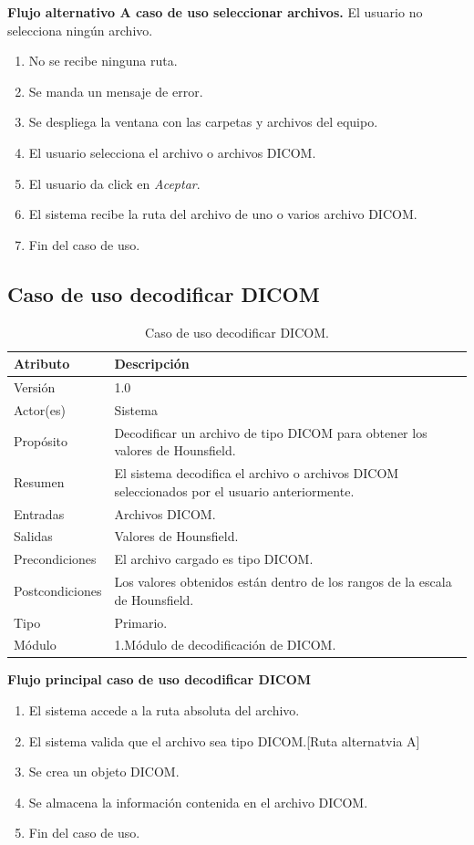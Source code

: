\documentclass[12pt]{report}
\begin{document}
\textbf{Flujo alternativo A caso de uso seleccionar archivos. }
El usuario no selecciona ningún archivo.
\begin{enumerate}[{A}1{.}]
\item No se recibe ninguna ruta.
\item Se manda un mensaje de error.
\item Se despliega la ventana con las carpetas y archivos del equipo.
\item El usuario selecciona el archivo o archivos DICOM.
\item El usuario da click en \textit{Aceptar}.
\item El sistema recibe la ruta del archivo de uno o varios archivo DICOM.
\item Fin del caso de uso.
\end{enumerate}

\subsection{Caso de uso decodificar DICOM}
\begin{table}[H]
\begin{center}
\begin{tabular}{|p{25mm}|p{60mm}|}
\hline
Atributo & Descripción\\
\hline \hline 
Versión & 1.0\\
\hline
Actor(es) & Sistema\\
\hline
Propósito & Decodificar un archivo de tipo DICOM para obtener los valores de Hounsfield.\\
\hline
Resumen & El sistema decodifica el archivo o archivos DICOM seleccionados por el usuario anteriormente.\\
\hline
Entradas & Archivos DICOM.\\
\hline
Salidas & Valores de Hounsfield.\\
\hline
Precondiciones & El archivo cargado es tipo DICOM.\\
\hline
Postcondiciones & Los valores obtenidos están dentro de los rangos de la escala de Hounsfield.\\
\hline
Tipo & Primario.\\
\hline 
Módulo & 1.Módulo de decodificación de DICOM.\\
\hline
\end{tabular}
\caption{Caso de uso decodificar DICOM.}
\end{center}
\end{table}

\textbf{Flujo principal caso de uso decodificar DICOM}
\begin{enumerate}
\item El sistema accede a la ruta absoluta del archivo.
\item El sistema valida que el archivo sea tipo DICOM.[Ruta alternatvia A]
\item Se crea un objeto DICOM.
\item Se almacena la información contenida en el archivo DICOM.
\item Fin del caso de uso.
\end{enumerate}
\end{document}
